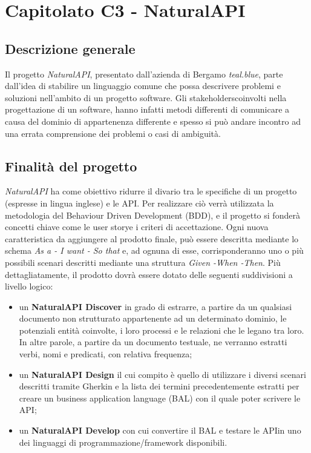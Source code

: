 \section{Capitolato C3 - NaturalAPI }

\subsection{Descrizione generale}
Il progetto \textit{NaturalAPI}, presentato dall’azienda di Bergamo \textit{teal.blue}, parte dall'idea di stabilire un linguaggio comune che possa descrivere problemi e soluzioni nell'ambito di un progetto software. Gli stakeholders\glo coinvolti nella progettazione di un software, hanno infatti metodi differenti di comunicare a causa del dominio di appartenenza differente e spesso si può andare incontro ad una errata comprensione dei problemi o casi di ambiguità.

\subsection{Finalità del progetto}
\textit{NaturalAPI} ha come obiettivo ridurre il divario tra le specifiche di un progetto (espresse in lingua inglese) e le API\glos. Per realizzare ciò verrà utilizzata la metodologia del Behaviour Driven Development (BDD)\glos, e il progetto si fonderà concetti chiave come le user story\glo e i criteri di accettazione\glo. Ogni nuova caratteristica da aggiungere al prodotto finale, può essere descritta mediante lo schema \textit{As a - I want - So that} e, ad ognuna di esse, corrisponderanno uno o più possibili scenari descritti mediante una struttura \textit{Given -When -Then}. Più dettagliatamente, il prodotto dovrà essere dotato delle seguenti suddivisioni a livello logico:  
\begin{itemize}
	\item un \textbf{NaturalAPI Discover} in grado di estrarre, a partire da un qualsiasi documento non strutturato appartenente ad un determinato dominio, le potenziali entità coinvolte, i loro processi e le relazioni che le legano tra loro. In altre parole, a partire da un documento testuale, ne verranno estratti verbi, nomi e predicati, con relativa frequenza;
	\item un \textbf{NaturalAPI Design} il cui compito è quello di utilizzare i diversi scenari descritti tramite Gherkin e la lista dei termini precedentemente estratti per creare un business application language (BAL) con il quale poter scrivere le API\glos;
	\item un \textbf{NaturalAPI Develop} con cui convertire il BAL e testare le API\glo in uno dei  linguaggi di programmazione/framework disponibili. 
\end{itemize}


